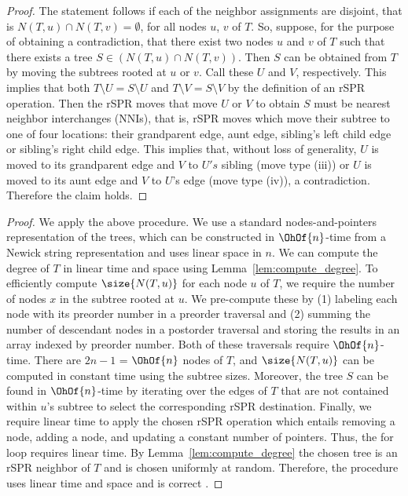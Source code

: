 \documentclass[11pt]{amsart}
\newcommand{\cuttable}[2][]{%
    \ifthenelse{\equal{#1}{}}%
		{}%
		{#1}%
}
\begin{document}
\computedegree*
\begin{proof}
	The statement follows if each of the neighbor assignments are disjoint, that is $N(T,u) \cap N(T,v) = \emptyset$, for all nodes $u$, $v$ of $T$.
	So, suppose, for the purpose of obtaining a contradiction, that there exist two nodes $u$ and $v$ of $T$ such that there exists a tree $S \in (N(T,u) \cap N(T,v))$.
	Then $S$ can be obtained from $T$ by moving the subtrees rooted at $u$ or $v$.
	Call these $U$ and $V$, respectively.
	This implies that both $T \setminus U = S \setminus U$ and $T \setminus V = S \setminus V$ by the definition of an rSPR operation.
	Then the rSPR moves that move $U$ or $V$ to obtain $S$ must be nearest neighbor interchanges (NNIs), that is, rSPR moves which move their subtree to one of four locations: their grandparent edge, aunt edge, sibling's left child edge or sibling's right child edge.
	This implies that, without loss of generality, $U$ is moved to its grandparent edge and $V$ to $U's$ sibling (move type (iii)) or $U$ is moved to its aunt edge and $V$ to $U$'s edge (move type (iv)), a contradiction.
	Therefore the claim holds.
\end{proof}

\selectrandomneighbor*
\begin{proof}
	We apply the above procedure.
	We use a standard nodes-and-pointers representation of the trees, which can be constructed in $\OhOf{n}$-time from a Newick string representation and uses linear space in $n$.
	We can compute the degree of $T$ in linear time and space using Lemma~\ref{lem:compute_degree}.
	To efficiently compute $\size{N(T,u)}$ for each node $u$ of $T$, we require the number of nodes $x$ in the subtree rooted at $u$.
	We pre-compute these by (1) labeling each node with its preorder number in a preorder traversal and (2) summing the number of descendant nodes in a postorder traversal and storing the results in an array indexed by preorder number.
	Both of these traversals require $\OhOf{n}$-time.
	There are $2n-1$ = $\OhOf{n}$ nodes of $T$, and $\size{N(T,u)}$ can be computed in constant time using the subtree sizes.
	Moreover, the tree $S$ can be found in $\OhOf{n}$-time by iterating over the edges of $T$ that are not contained within $u$'s subtree to select the corresponding rSPR destination.
	Finally, we require linear time to apply the chosen rSPR operation which entails removing a node, adding a node, and updating a constant number of pointers.
	Thus, the for loop requires linear time.
	By Lemma~\ref{lem:compute_degree} the chosen tree is an rSPR neighbor of $T$ and is chosen uniformly at random.
	Therefore, the procedure uses linear time and space and \cuttable[is correct]{selects an rSPR neighbor of $T$ uniformly at random}.
\end{proof}
\end{document}
